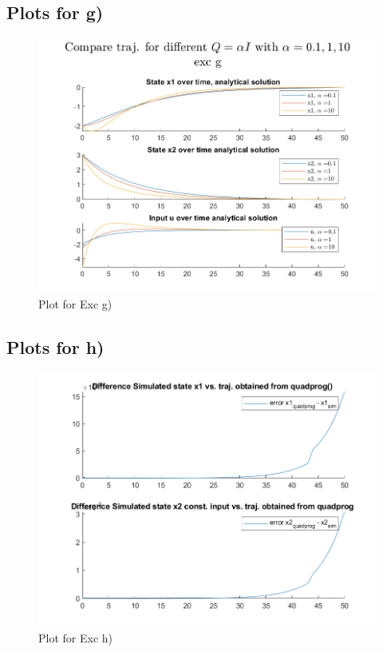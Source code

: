\documentclass[]{article}
\begin{document}
\subsection{Plots for g)}
\begin{figure}[H]
	\centering
	\includegraphics[width=0.95\linewidth]{plots/exc_g.png}
	\caption{Plot for Exc g)}
	\label{fig:excg}
\end{figure}

\subsection{Plots for h)}
\begin{figure}[H]
	\centering
	\includegraphics[width=0.95\linewidth]{plots/exc_h.png}
	\caption{Plot for Exc h)}
	\label{fig:exch}
\end{figure}
\end{document}
